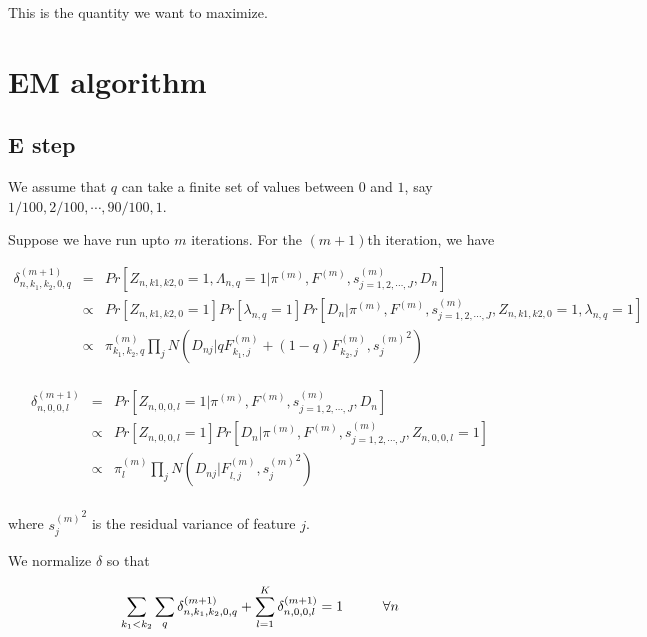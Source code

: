 \documentclass[12pt]{article}
\begin{document}
This is the quantity we want to maximize. 

\section{EM algorithm}
\subsection{E step}

We assume that $q$ can take a finite set of values between $0$ and $1$, 
say $1/100, 2/100, \cdots, 90/100, 1$.

Suppose we have run upto $m$ iterations. For the $(m+1)$th iteration, we have 

\begin{eqnarray} \nonumber
\delta^{(m+1)}_{n, k_1, k_2, 0, q} &=& Pr \left [ Z_{n, k1, k2, 0} = 1, \Lambda_{n,q} = 1 | \pi^{(m)}, F^{(m)}, s^{(m)}_{j=1,2,\cdots,J}, D_{n} \right ] \\ \nonumber
 &\propto& Pr \left [ Z_{n, k1, k2,0} = 1 \right] Pr \left [ \lambda_{n,q} = 1 \right] Pr \left [ D_{n} | \pi^{(m)}, F^{(m)}, s^{(m)}_{j=1,2,\cdots,J}, Z_{n, k1, k2, 0}= 1, \lambda_{n, q}=1 \right] \\ \nonumber
 &\propto& \pi^{(m)}_{k_1,k_2, q} \prod_{j} N \left (D_{nj} | qF^{(m)}_{k_1,j} + (1-q)F^{(m)}_{k_2,j}, {s_j^{(m)}}^2 \right) \\ \nonumber
\end{eqnarray}

\begin{eqnarray} \nonumber
\delta^{(m+1)}_{n, 0, 0, l}  &=& Pr \left [ Z_{n, 0, 0, l} = 1  |  \pi^{(m)}, F^{(m)}, s^{(m)}_{j=1,2,\cdots,J}, D_{n} \right ] \\ \nonumber 
& \propto & Pr \left [ Z_{n, 0, 0, l} = 1 \right] Pr \left [ D_{n} | \pi^{(m)}, F^{(m)}, s^{(m)}_{j=1,2,\cdots,J}, Z_{n, 0, 0, l}= 1 \right] \\ \nonumber 
& \propto & \pi^{(m)}_{l}  \prod_{j} N \left (D_{nj} | F^{(m)}_{l,j} , {s_j^{(m)}}^2 \right) \\  \nonumber
\end{eqnarray}


where ${s_j^{(m)}}^2$ is the residual variance of feature $j$.

We normalize $\delta$ so that 

$$ \sum_{k_1 < k_2} \sum_{q} \delta^{(m+1)}_{n, k_1, k_2, 0, q}  + \sum_{l=1}^{K} \delta^{(m+1)}_{n, 0, 0, l}= 1 \hspace{1 cm} \forall n $$
\end{document}
